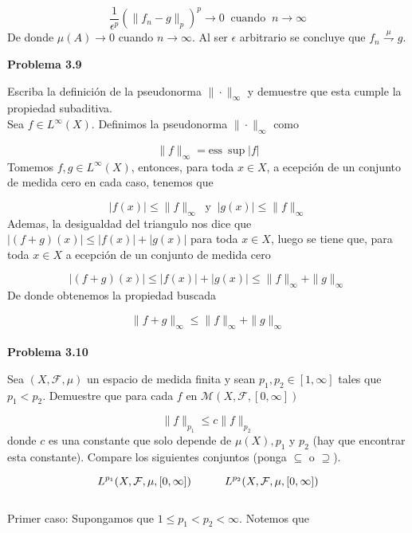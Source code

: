 \documentclass[12pt]{article}
\begin{document}
    \[\frac{1}{\epsilon^p}(\|f_n-g\|_p)^p\rightarrow 0\;\; \text{cuando}\;\;n\rightarrow \infty\]
    De donde $\mu(A)\rightarrow 0$ cuando $n\rightarrow \infty$. Al ser $\epsilon$ arbitrario
    se concluye que $f_n \overset{\mu}{\rightharpoondown} g$.
    \newpage 

    \textbf{Problema 3.9}

    Escriba la definici\'on de la pseudonorma $\|\cdot\|_{\infty}$ y demuestre que esta 
    cumple la propiedad subaditiva.
    \\

    Sea $f\in L^{\infty}(X)$. Definimos la pseudonorma $\|\cdot\|_{\infty}$ como

    \[\|f\|_{\infty} = \mathrm{ess}\:\sup |f|\]
    Tomemos $f,g\in L^{\infty} (X)$, entonces, para toda $x\in X$, a ecepci\'on de un
    conjunto de medida cero en cada caso, tenemos que 

    \[|f(x)| \leq \|f\|_{\infty}\;\; \text{y}\;\; |g(x)| \leq \|f\|_{\infty}\]
    Ademas, la desigualdad del triangulo nos dice que $|(f+g)(x)| \leq |f(x)|+|g(x)|$
    para toda $x\in X$, luego se tiene que, para toda $x\in X$ a ecepci\'on de un
    conjunto de medida cero

    \[|(f+g)(x)| \leq |f(x)|+|g(x)| \leq \|f\|_{\infty}+\|g\|_{\infty}\]
    De donde obtenemos la propiedad buscada

    \[\|f+g\|_{\infty} \leq \|f\|_{\infty}+\|g\|_{\infty}\]
    \\

    \textbf{Problema 3.10}

    Sea $(X,\mathcal{F},\mu)$ un espacio de medida finita y sean $p_1,p_2\in [1,\infty]$
    tales que $p_1 < p_2$. Demuestre que para cada $f$ en 
    $\mathcal{M}(X,\mathcal{F},[0,\infty])$

    \[\|f\|_{p_1} \leq c\|f\|_{p_2}\]
    donde $c$ es una constante que solo depende de $\mu(X),p_1$ y $p_2$ (hay que encontrar
    esta constante). Compare los siguientes conjuntos (ponga $\subseteq$ o $\supseteq$).

    \[L^{p_1}(X,\mathcal{F},\mu,[0,\infty])\hspace*{30pt} L^{p_2}(X,\mathcal{F},\mu,[0,\infty])\]
    \\

    Primer caso: Supongamos que $1 \leq p_1 < p_2 < \infty$. Notemos que 
\end{document}

